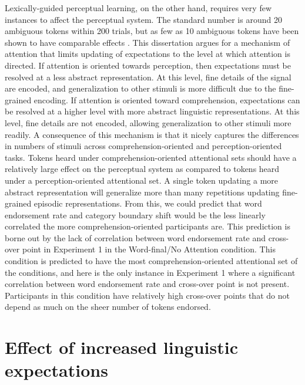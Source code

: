 Lexically-guided perceptual learning, on the other hand, requires very few instances to affect the perceptual system.
The standard number is around 20 ambiguous tokens within 200 trials, but as few as 10 ambiguous tokens have been shown to have comparable effects \citep{Kraljic2008}.
This dissertation argues for a mechanism of attention that limits updating of expectations to the level at which attention is directed.
If attention is oriented towards perception, then expectations must be resolved at a less abstract representation.
At this level, fine details of the signal are encoded, and generalization to other stimuli is more difficult due to the fine-grained encoding.
If attention is oriented toward comprehension, expectations can be resolved at a higher level with more abstract linguistic representations.
At this level, fine details are not encoded, allowing generalization to other stimuli more readily.
A consequence of this mechanism is that it nicely captures the differences in numbers of stimuli across comprehension-oriented and perception-oriented tasks.
Tokens heard under comprehension-oriented attentional sets should have a relatively large effect on the perceptual system as compared to tokens heard under a perception-oriented attentional set.
A single token updating a more abstract representation will generalize more than many repetitions updating fine-grained episodic representations.
From this, we could predict that word endorsement rate and category boundary shift would be the less linearly correlated the more comprehension-oriented participants are.
This prediction is borne out by the lack of correlation between word endorsement rate and cross-over point in Experiment 1 in the Word-final/No Attention condition.
This condition is predicted to have the most comprehension-oriented attentional set of the conditions, and here is the only instance in Experiment 1 where a significant correlation between word endorsement rate and cross-over point is not present.
Participants in this condition have relatively high cross-over points that do not depend as much on the sheer number of tokens endorsed.

\section{Effect of increased linguistic expectations}

